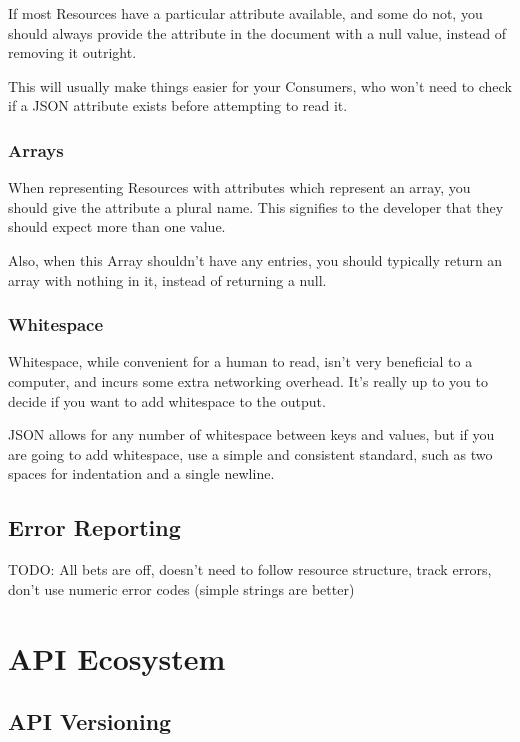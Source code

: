\documentclass{book}
\begin{document}
If most Resources have a particular attribute available, and some do not, you should always provide the attribute in the document with a null value, instead of removing it outright.

This will usually make things easier for your Consumers, who won't need to check if a JSON attribute exists before attempting to read it.

\subsection{Arrays}

When representing Resources with attributes which represent an array, you should give the attribute a plural name. This signifies to the developer that they should expect more than one value.

Also, when this Array shouldn't have any entries, you should typically return an array with nothing in it, instead of returning a null.

\subsection{Whitespace}

Whitespace, while convenient for a human to read, isn't very beneficial to a computer, and incurs some extra networking overhead. It's really up to you to decide if you want to add whitespace to the output.

JSON allows for any number of whitespace between keys and values, but if you are going to add whitespace, use a simple and consistent standard, such as two spaces for indentation and a single newline.

\section{Error Reporting}

TODO: All bets are off, doesn't need to follow resource structure, track errors, don't use numeric error codes (simple strings are better)


\chapter{API Ecosystem}

\section{API Versioning}
\end{document}
